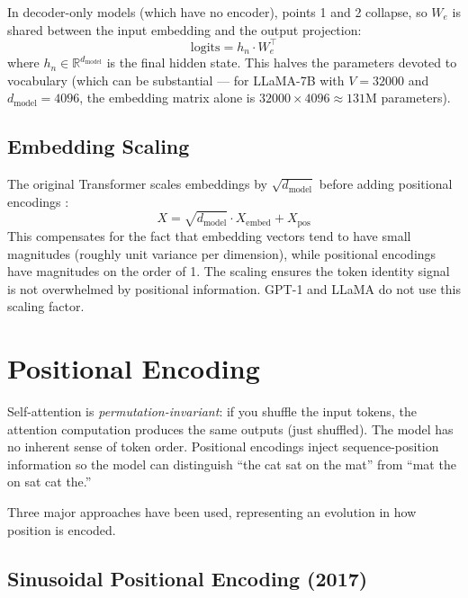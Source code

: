 \documentclass[11pt,a4paper]{article}
\newcommand{\R}{\mathbb{R}}
\newcommand{\dmodel}{d_{\text{model}}}
\begin{document}
In decoder-only models (which have no encoder), points 1 and 2 collapse, so $W_e$ is
shared between the input embedding and the output projection:
\begin{equation}
  \text{logits} = h_n \cdot W_e^\top
\end{equation}
where $h_n \in \R^{\dmodel}$ is the final hidden state. This halves the parameters
devoted to vocabulary (which can be substantial --- for LLaMA-7B with $V = 32000$ and
$\dmodel = 4096$, the embedding matrix alone is $32000 \times 4096 \approx 131$M
parameters).

\subsection{Embedding Scaling}

The original Transformer scales embeddings by $\sqrt{\dmodel}$ before adding positional
encodings \cite{vaswani2017}:
\begin{equation}
  X = \sqrt{\dmodel} \cdot X_{\text{embed}} + X_{\text{pos}}
\end{equation}
This compensates for the fact that embedding vectors tend to have small magnitudes
(roughly unit variance per dimension), while positional encodings have magnitudes on the
order of 1. The scaling ensures the token identity signal is not overwhelmed by positional
information. GPT-1 and LLaMA do not use this scaling factor.


\section{Positional Encoding}
\label{sec:positional-encoding}

Self-attention is \emph{permutation-invariant}: if you shuffle the input tokens,
the attention computation produces the same outputs (just shuffled). The model has no
inherent sense of token order. Positional encodings inject sequence-position information
so the model can distinguish ``the cat sat on the mat'' from ``mat the on sat cat the.''

Three major approaches have been used, representing an evolution in how position is
encoded.

\subsection{Sinusoidal Positional Encoding (2017)}
\end{document}
